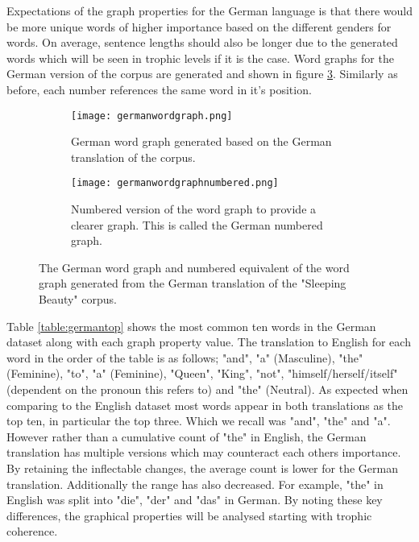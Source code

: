 Expectations of the graph properties for the German language is that there would be more unique words of higher importance based on the different genders for words. On average, sentence lengths should also be longer due to the generated words which will be seen in trophic levels if it is the case. Word graphs for the German version of the corpus are generated and shown in figure \ref{fig:gergraph}. Similarly as before, each number references the same word in it's position.

\begin{figure}[H]
\centering
\begin{subfigure}{.45\textwidth}
	\texttt{[image: germanwordgraph.png]}
	\caption{German word graph generated based on the German translation of the corpus.}
	\label{fig:gerword}
\end{subfigure}
\hfill
\begin{subfigure}{.45\textwidth}
	\hspace{-2cm} 
	\texttt{[image: germanwordgraphnumbered.png]}
	\caption{Numbered version of the word graph to provide a clearer graph. This is called the German numbered graph.}
	\label{fig:gernum}
\end{subfigure}
\caption{The German word graph and numbered equivalent of the word graph generated from the German translation of the "Sleeping Beauty" corpus.}
\label{fig:gergraph}
\end{figure}

Table \ref{table:germantop} shows the most common ten words in the German dataset along with each graph property value. The translation to English for each word in the order of the table is as follows; "and", "a" (Masculine), "the" (Feminine), "to", "a" (Feminine), "Queen", "King", "not", "himself/herself/itself" (dependent on the pronoun this refers to) and "the" (Neutral). As expected when comparing to the English dataset most words appear in both translations as the top ten, in particular the top three. Which we recall was "and", "the" and "a". However rather than a cumulative count of "the" in English, the German translation has multiple versions which may counteract each others importance. By retaining the inflectable changes, the average count is lower for the German translation. Additionally the range has also decreased. For example, "the" in English was split into "die", "der" and "das" in German. By noting these key differences, the graphical properties will be analysed starting with trophic coherence.

